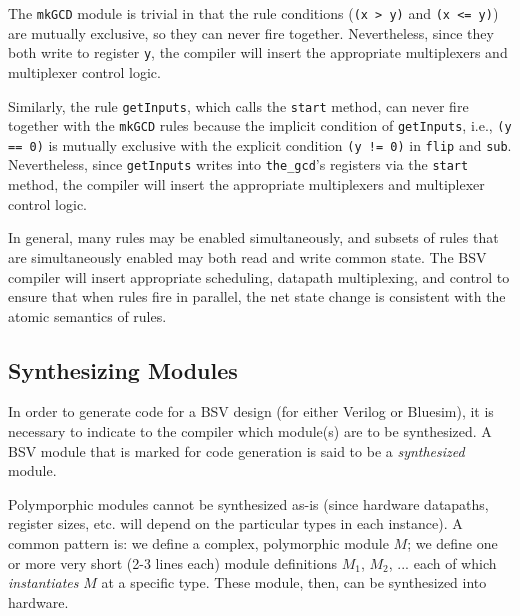 \documentclass[twoside,letterpaper]{article}
\newcommand{\BSV}{BSV}
\newcommand{\veri}{Verilog}
\newcommand{\te}[1]{\texttt{#1}}
\begin{document}
The \texttt{mkGCD} module is trivial in that the rule conditions
(\mbox{\texttt{(x > y)}} and \mbox{\texttt{(x <= y)}}) are mutually exclusive,
so they can never fire together. Nevertheless, since they both write
to register \texttt{y}, the compiler will insert the appropriate
multiplexers and multiplexer control logic.

Similarly, the rule \texttt{getInputs}, which calls the \texttt{start}
method, can never fire together with the \texttt{mkGCD} rules because the
implicit condition of \texttt{getInputs}, i.e., \mbox{\texttt{(y == 0)}} is
mutually exclusive with the explicit condition \mbox{\texttt{(y != 0)}} in
\texttt{flip} and \texttt{sub}.  Nevertheless, since \texttt{getInputs} writes
into \texttt{the\_gcd}'s registers via the \texttt{start} method, the
compiler will insert the appropriate multiplexers and multiplexer
control logic.

In general, many rules may be enabled simultaneously, and subsets of
rules that are simultaneously enabled may both read and write common
state.  The {\BSV} compiler will insert appropriate scheduling,
datapath multiplexing, and control to ensure that when rules fire in
parallel, the net state change is consistent with the atomic semantics
of rules.

\subsection{Synthesizing Modules}

\index{synthesize@\te{synthesize}!modules}

\label{sec-synthesize}

In order to generate code for a {\BSV} design (for either {\veri} or
Bluesim), it is necessary to indicate to the compiler which module(s)
are to be synthesized. A {\BSV} module that is marked for code
generation is said to be a \emph{synthesized} module.

Polymporphic modules cannot be synthesized as-is (since hardware
datapaths, register sizes, etc. will depend on the particular types in
each instance).  A common pattern is: we define a complex, polymorphic
module $M$; we define one or more very short (2-3 lines each) module
definitions $M_1$, $M_2$, ... each of which \emph{instantiates} $M$ at
a specific type.  These module, then, can be synthesized into
hardware.
\end{document}
